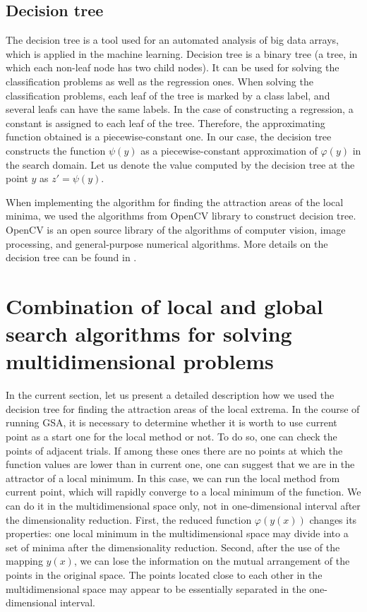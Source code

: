 \documentclass{svproc}
\begin{document}
\subsection{Decision tree}\label{SecDT}

The decision tree is a tool used for an automated analysis of big data arrays, which is applied in the  machine learning. Decision tree is a binary tree (a tree, in which each non-leaf node has two child nodes). It can be used for solving the classification problems as well as the regression ones. When solving  the classification problems, each leaf of the tree is marked by a class label, and several leafs can have  the same labels. In the case of constructing a regression, a constant is assigned to each leaf of the tree.   Therefore, the approximating function obtained is a piecewise-constant one. In our case, the decision tree constructs the function $\psi(y)$ as a piecewise-constant  approximation of $\varphi(y)$ in the search domain. Let us denote the value  computed by the  decision tree at the point $y$ as $z' = \psi(y)$.

When implementing the algorithm for finding the attraction areas of the local  minima, we used the algorithms from OpenCV library to construct decision tree. OpenCV is an open source library of the algorithms of computer vision, image processing, and  general-purpose numerical algorithms. More details on the decision tree can be found  in \cite{fio_bib16}.

\section{Combination of local and global search algorithms for solving multidimensional  problems}\label{SecGSAL}

In the current section, let us present a detailed description how we used the decision tree for finding  the attraction areas of the local extrema.  In the course of running GSA, it is necessary to determine whether it is worth to use current point as a  start one for the local method or not. To do so, one can check the points of adjacent trials. If among  these ones there are no points at which the function values are lower than in current one, one  can suggest that we are in the attractor of a local minimum. In this case, we can run the local method  from current point, which will rapidly converge to a local minimum of the function.  We can do it in the multidimensional space only, not in one-dimensional interval after the  dimensionality reduction.  First, the reduced function $\varphi(y(x))$ changes its properties: one local minimum in the  multidimensional space may divide into a set of minima after the dimensionality reduction.  Second, after the use of the mapping $y(x)$, we can lose the information on the mutual arrangement of  the points in the original space. The points located close to each other in the multidimensional space  may appear to be essentially separated in the one-dimensional interval.
\end{document}
